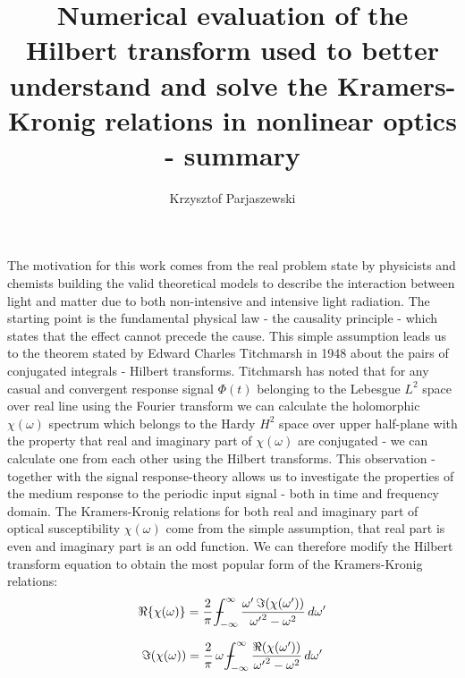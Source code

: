 \documentclass[10pt,twoside,a4paper]{article}
\title{Numerical evaluation of the Hilbert transform used to better understand 
and solve the Kramers-Kronig relations in nonlinear optics - summary}
\author{Krzysztof Parjaszewski}
\date{}
\def\Xint#1{\mathchoice
{\XXint\displaystyle\textstyle{#1}}%
{\XXint\textstyle\scriptstyle{#1}}%
{\XXint\scriptstyle\scriptscriptstyle{#1}}%
{\XXint\scriptscriptstyle\scriptscriptstyle{#1}}%
\!\int}
\def\XXint#1#2#3{{\setbox0=\hbox{$#1{#2#3}{\int}$ }
\vcenter{\hbox{$#2#3$ }}\kern-.6\wd0}}
\def\dashint{\Xint-}
\begin{document}
\maketitle
\paragraph{}
The motivation for this work comes from the real problem state by
physicists and chemists building the valid theoretical models to
describe the interaction between light and matter due to both
non-intensive and intensive light radiation. The starting point is the
fundamental physical law - the causality principle - which states that
the effect cannot precede the cause. This simple assumption leads us
to the theorem stated by Edward Charles Titchmarsh in 1948 about the
pairs of conjugated integrals - Hilbert transforms. Titchmarsh has
noted that for any casual and convergent response signal $\Phi (t)$ belonging to the Lebesgue 
$L^{2}$ space over real line using the Fourier transform we can calculate
the holomorphic $\chi (\omega )$ spectrum which belongs to the Hardy 
$H^{2}$ space over upper half-plane with the property that real and
imaginary part of $\chi (\omega )$ are conjugated - we can calculate one from each other using the
Hilbert transforms. This observation - together with the signal
response-theory allows us to investigate the properties of the medium
response to the periodic input signal - both in time and frequency
domain. The Kramers-Kronig relations for both real and imaginary part
of optical susceptibility $\chi (\omega )$  come from the simple assumption, that real part is even and
imaginary part is an odd function. We can therefore modify the Hilbert
transform equation to obtain the most popular form of the
Kramers-Kronig relations:
$$\Re \{ \chi (\omega ) \}=\frac {2}{\pi} \,\dashint _{ - \infty }^{\infty }
\frac {\omega^{\prime} \,\Im (\chi (\omega^{\prime} ))}{{\omega^{\prime}} ^{2} - \omega ^{2}}
\,d \omega^{\prime}  $$


$$\Im (\chi (\omega ))=\frac {2}{\pi}\,\omega \,\dashint _{ - \infty }^{
\infty }\frac {\Re (\chi (\omega^{\prime} ))}{{\omega^{\prime}} ^{2} - \omega ^{2}}\,
d\omega^{\prime}  $$
\end{document}
